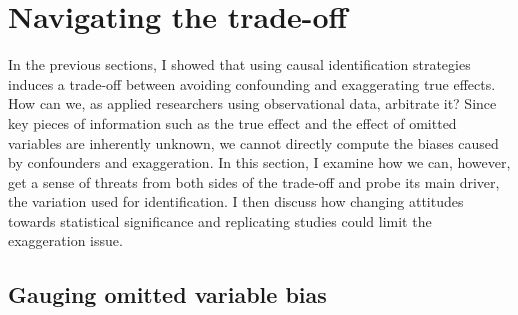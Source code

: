 \documentclass[usletter, 12pt]{article}
\begin{document}
			
		
		



	\section{Navigating the trade-off} \label{discussion}

 		In the previous sections, I showed that using causal identification strategies induces a trade-off between avoiding confounding and exaggerating true effects. How can we, as applied researchers using observational data, arbitrate it? Since key pieces of information such as the true effect and the effect of omitted variables are inherently unknown, we cannot directly compute the biases caused by confounders and exaggeration. In this section, I examine how we can, however, get a sense of threats from both sides of the trade-off and probe its main driver, the variation used for identification. I then discuss how changing attitudes towards statistical significance and replicating studies could limit the exaggeration issue.
	
	
		\subsection{Gauging omitted variable bias}
	
\end{document}
